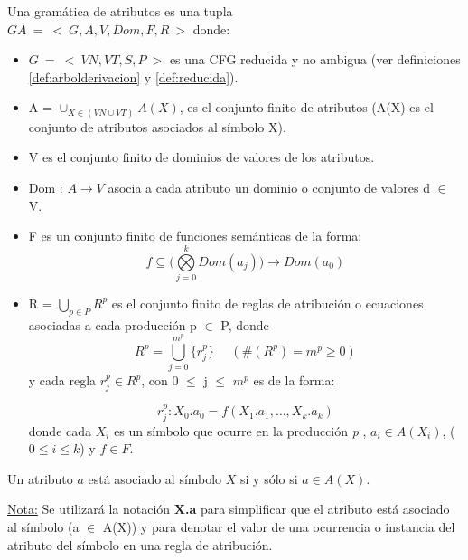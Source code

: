 \begin{definition}
\label{def:grammarattr}
Una gramática de atributos es una tupla\\
 $GA\ =\ <\ G,A,V,Dom,F,R\ >$ donde:
\begin{itemize}
\item $G\ =\ <\ VN,VT,S,P\ >$ es una CFG reducida y no ambigua (ver definiciones \ref{def:arbolderivacion} y \ref{def:reducida}).
\item A = $\cup_{X\in(VN \cup VT)} A(X)$, es el conjunto finito de atributos (A(X) es el conjunto de atributos asociados al símbolo X).

\item V es el conjunto finito de dominios de valores de los atributos.

\item Dom : $A\rightarrow V$ asocia a cada atributo un dominio o conjunto de valores d $\in$ V.

\item F es un conjunto finito de funciones semánticas de la forma:
\begin{equation}
f \subseteq (\bigotimes\limits_{j=0}^{k}{ Dom(a_{j} ))\rightarrow Dom(a_{0})}
\end{equation}

\item R = $\bigcup _{p \in P} R^{p}$ es el conjunto finito de reglas de atribución o ecuaciones asociadas a cada producción p $\in$ P, donde
\begin{equation}
R^{p} = \bigcup\limits_{j=0}^{m^{p}}{\{r_{j}^{p}\}}\ \ \ \ \ \ (\#(R^{p} ) = m^{p} \geq 0)
\end{equation}
y cada regla $r_{j}^{p} \in R^{p}$, con 0 $\leq$ j $\leq$ $m^{p}$ es de la forma:

\begin{equation}
r_{j}^{p}: X_{0}.a_{0} = f(X_{1}.a_{1} ,\dots , X_{k}.a_{k})
\end{equation} 
donde cada $X_{i}$ es un símbolo que ocurre en la producción \textit{p} , $a_{i} \in A(X_{i})$, ($0 \leqslant i \leqslant k$) y $f \in F$.

\end{itemize}
\end{definition}

\begin{definition} Un atributo $a$ está asociado al símbolo $X$ si y sólo si $a \in A(X)$. 
\end{definition}
\underline{Nota:}
Se utilizará la notación \textbf{X.a} para simplificar que el atributo  está asociado al símbolo  (a $\in$ A(X)) y para denotar el valor de una ocurrencia o instancia del atributo  del símbolo  en una regla de atribución.


